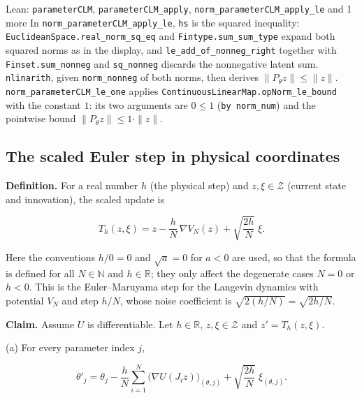 \documentclass[11pt,a4paper]{report}
\begin{document}
\begin{leanbox}{Lean: \texttt{parameterCLM}, \texttt{parameterCLM\_\allowbreak{}apply}, \texttt{norm\_\allowbreak{}parameterCLM\_\allowbreak{}apply\_\allowbreak{}le} and 1 more}
In \texttt{norm\_\allowbreak{}parameter\allowbreak{}CLM\_\allowbreak{}apply\_\allowbreak{}le}, \texttt{hs} is the squared inequality: \texttt{Euclidean\allowbreak{}Space.\allowbreak{}real\_\allowbreak{}norm\_\allowbreak{}sq\_\allowbreak{}eq} and \texttt{Fintype.\allowbreak{}sum\_\allowbreak{}sum\_\allowbreak{}type} expand both squared norms as in the display, and \texttt{le\_\allowbreak{}add\_\allowbreak{}of\_\allowbreak{}nonneg\_\allowbreak{}right} together with \texttt{Finset.\allowbreak{}sum\_\allowbreak{}nonneg} and \texttt{sq\_\allowbreak{}nonneg} discards the nonnegative latent sum. \texttt{nlinarith}, given \texttt{norm\_\allowbreak{}nonneg} of both norms, then derives \(\|P_\theta z\|\le\|z\|\). \texttt{norm\_\allowbreak{}parameter\allowbreak{}CLM\_\allowbreak{}le\_\allowbreak{}one} applies \texttt{Continuous\allowbreak{}Linear\allowbreak{}Map.\allowbreak{}op\allowbreak{}Norm\_\allowbreak{}le\_\allowbreak{}bound} with the constant \(1\): its two arguments are \(0\le1\) (\texttt{by norm\_\allowbreak{}num}) and the pointwise bound \(\|P_\theta z\|\le1\cdot\|z\|\).
\end{leanbox}
\subsection{\texorpdfstring{The scaled Euler step in physical coordinates}{The scaled Euler step in physical coordinates}}
\label{report-step-IPLA-Geometry-lean-7}


\textbf{Definition.} For a real number \(h\) (the physical step) and \(z,\xi\in\mathcal Z\) (current state and innovation), the scaled update is


\[T_h(z,\xi)=z-\frac hN\,\nabla V_N(z)+\sqrt{\frac{2h}N}\;\xi .\]


Here the conventions \(h/0=0\) and \(\sqrt a=0\) for \(a<0\) are used, so that the formula is defined for all \(N\in\mathbb N\) and \(h\in\mathbb R\); they only affect the degenerate cases \(N=0\) or \(h<0\). This is the Euler–Maruyama step for the Langevin dynamics with potential \(V_N\) and step \(h/N\), whose noise coefficient is \(\sqrt{2(h/N)}=\sqrt{2h/N}\).




\textbf{Claim.} Assume \(U\) is differentiable. Let \(h\in\mathbb R\), \(z,\xi\in\mathcal Z\) and \(z'=T_h(z,\xi)\).




(a) For every parameter index \(j\),


\[\theta'_j=\theta_j-\frac hN\sum_{i=1}^N\bigl(\nabla U(J_iz)\bigr)_{(\theta,j)}+\sqrt{\frac{2h}N}\;\xi_{(\theta,j)} .\]
\end{document}
